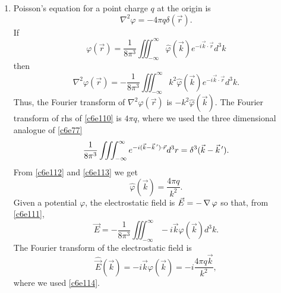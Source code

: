 \begin{enumerate}
\item Poisson's equation for a point charge $q$ at the origin is
\begin{equation}\label{c6e110}
\nabla^2\varphi = -4\pi q\delta(\vec{r}).
\end{equation}
If 
\begin{equation}\label{c6e111}
\varphi(\vec{r}) = \frac{1}{8\pi^3}\iiint_{-\infty}^\infty \hat{\varphi}(\vec{k})e^{-i\vec{k}\cdot\vec{r}}d^3k
\end{equation}
then
\begin{equation}\label{c6e112}
\nabla^2\varphi(\vec{r}) = -\frac{1}{8\pi^3}\iiint_{-\infty}^\infty k^2\hat{\varphi}(\vec{k})e^{-i\vec{k}\cdot\vec{r}}d^3k.
\end{equation}
Thus, the Fourier transform of $\nabla^2\varphi(\vec{r})$ is $-k^2\hat{\varphi}(\vec{k})$.
The Fourier transform of rhs of \eqref{c6e110} is $4\pi q$, where we used the three
dimensional analogue of \eqref{c6e77}
\begin{equation}\label{c6e113}
\frac{1}{8\pi^3}\iiint_{-\infty}^\infty e^{-i(\vec{k} - \vec{k}^{\,\prime})\cdot\vec{r}}d^3r
 = \delta^3(\vec{k} - \vec{k}^{\,\prime}).
\end{equation}
From \eqref{c6e112} and \eqref{c6e113} we get
\begin{equation}\label{c6e114}
\hat{\varphi}(\vec{k}) = \frac{4\pi q}{k^2}.
\end{equation}
Given a potential $\varphi$, the electrostatic field is $\vec{E} = -\operatorname{\nabla}\varphi$
so that, from \eqref{c6e111},
\begin{equation}\label{c6e115}
\vec{E} = -\frac{1}{8\pi^3}\iiint_{-\infty}^\infty -i\vec{k}\varphi(\vec{k}) d^3k.
\end{equation}
The Fourier transform of the electrostatic field is
\begin{equation}\label{c6e116}
\hat{\vec{E}}(\vec{k}) = -i\vec{k}\varphi(\vec{k})  = -i\frac{4\pi q\vec{k}}{k^2},
\end{equation}
where we used \eqref{c6e114}.


\end{enumerate}
